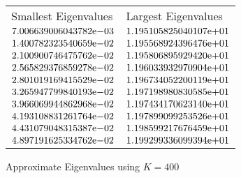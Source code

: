 \begin{enumerate}
\begin{figure} 
 \centering    
\begin{tabular}{ ||p{6cm}||p{6cm}|}
\hline
 Smallest Eigenvalues & Largest Eigenvalues \\ \hhline{|=|=|}    
\hline
${7.006639006043782}\mathrm{e}{-03}$ & ${1.195105825040107}\mathrm{e}{+01}$ \\  
${1.400782323540659}\mathrm{e}{-02}$ & ${1.195568924396476}\mathrm{e}{+01}$ \\  
${2.100900746475762}\mathrm{e}{-02}$ & ${1.195806895929420}\mathrm{e}{+01}$ \\  
${2.565829376859278}\mathrm{e}{-02}$ & ${1.196033932970904}\mathrm{e}{+01}$ \\  
${2.801019169415529}\mathrm{e}{-02}$ & ${1.196734052200119}\mathrm{e}{+01}$ \\  
${3.265947799840193}\mathrm{e}{-02}$ & ${1.197198980830585}\mathrm{e}{+01}$ \\  
${3.966069944862968}\mathrm{e}{-02}$ & ${1.197434170623140}\mathrm{e}{+01}$ \\  
${4.193108831261764}\mathrm{e}{-02}$ & ${1.197899099253526}\mathrm{e}{+01}$ \\  
${4.431079048315387}\mathrm{e}{-02}$ & ${1.198599217676459}\mathrm{e}{+01}$ \\  
${4.897191625334762}\mathrm{e}{-02}$ & ${1.199299336099394}\mathrm{e}{+01}$ \\  
\hline  
\end{tabular} 
\caption{Approximate Eigenvalues using $K = 400$}
   \label{tab:eig400}
\end{figure} 


\end{enumerate}
